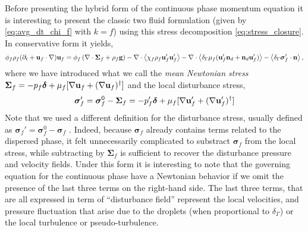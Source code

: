 Before presenting the hybrid form of the continuous phase momentum equation it is interesting to present the classic two fluid formulation (given by \ref{eq:avg_dt_chi_f} with $k=f$) using this stress decomposition \eqref{eq:stress_closure}. 
In conservative form it yields, 
\begin{equation}
    \phi_f \rho_f(\pddt + \textbf{u}_f  \cdot \grad) \textbf{u}_f
    = \phi_f 
    \left(\div \bm{\Sigma}_f
    + \rho_f \textbf{g}\right)
    -  \div \avg{\chi_f\rho_f \textbf{u}_f'\textbf{u}_f'}
    - \div \avg{\delta_\Gamma \mu_f( \textbf{u}_f'  \textbf{n}_d +  \textbf{n}_d \textbf{u}_f')}
    - \avg{\delta_\Gamma \bm\sigma_f'\cdot \textbf{n}},
    \label{eq:two_fluid_momentum}
\end{equation}
where we have introduced what we call the \textit{mean Newtonian stress} $\bm{\Sigma}_f = -p_f \bm\delta + \mu_f [\mathbf{\nabla} \textbf{u}_f  + (\mathbf{\nabla} \textbf{u}_f)^\dagger]$ and the local disturbance stress, 
\begin{equation}
    \bm\sigma_f'
    =
    \bm\sigma_f^0 - \bm\Sigma_f 
    =
    -p_f' \bm\delta + \mu_f [\mathbf{\nabla} \textbf{u}_f'  + (\mathbf{\nabla} \textbf{u}_f')^\dagger]
\end{equation}
Note that we used a different definition for the disturbance stress, usually defined as $\bm\sigma_f'= \bm\sigma_f^0 - \bm\sigma_f$ \citep{zhang1997momentum}. 
Indeed, because $\bm\sigma_f$ already contains terms related to the dispersed phase, it felt unnecessarily complicated to substract $\bm\sigma_f$ from the local stress, while subtracting by $\bm\Sigma_f$ is sufficient to recover the disturbance pressure and velocity fields.
Under this form it is interesting to note that the governing equation for the continuous phase have a Newtonian behavior if we omit the presence of the last three terms on the right-hand side. 
The last three terms, that are all expressed in term of ``disturbance field'' represent the local velocities, and pressure fluctuation that arise due to the droplets (when proportional to $\delta_\Gamma$) or the local turbulence or pseudo-turbulence. 
 


